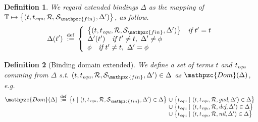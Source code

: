 \documentclass[12pt]{article}
\newtheorem{Definition}{Definition}[section]
\begin{document}
\begin{Definition}
  We regard extended bindings $\Delta$ as the mapping of
  $\mathbb{T} \mapsto \bigl\{(t, t_{\text{\it equ}}, \mathcal{R},
  \mathcal{S}_{\mathpzc{fin}}, \Delta') \bigr\}$, as follow.
  \begin{displaymath}
    \Delta(t') \;\stackrel{\mathrm{def}}{:=} \,\left\{\begin{array}{l}
      \bigl\{(t, t_{\text{\it equ}}, \mathcal{R},
       \mathcal{S}_{\mathpzc{fin}}, \Delta') \bigr\} \quad \text{\it if}\
        t' = t  \\
      \Delta'(t') \quad \text{\it if}\ t' \neq t,\ \Delta' \neq \phi  \\
       \phi \quad \text{\it if}\ t' \neq t,\ \Delta' = \phi
    \end{array}\right.
  \end{displaymath}
\end{Definition}


\begin{Definition}[Binding domain extended]
  We define a set of terms $t$ and $t_{\text{\it equ}}$ comming from
  $\Delta$ s.t. $(t, t_{\text{\it equ}}, \mathcal{R},
  \mathcal{S}_{\mathpzc{fin}}, \Delta') \in \Delta$ as
  $\mathpzc{Dom}(\Delta)$, e.g.
  \[ \mathpzc{Dom}(\Delta) \,\stackrel{\mathrm{def}}{:=}\,
  \bigl\{ t \ |\  (t, t_{\text{\it equ}}, \mathcal{R},
  \mathcal{S}_{\mathpzc{fin}}, \Delta') \in \Delta \bigr\}
  \!\begin{array}[t]{l}
    \cup\; \bigl\{t_{\text{\it equ}}  \ |\  (t, t_{\text{\it equ}},
     \mathcal{R},  \text{\it gnd}, \Delta') \in \Delta \bigr\}  \\
    \cup\; \bigl\{t_{\text{\it equ}}  \ |\  (t, t_{\text{\it equ}},
     \mathcal{R},  \text{\it def}, \Delta') \in \Delta \bigr\}  \\
    \cup\; \bigl\{t_{\text{\it equ}}  \ |\  (t, t_{\text{\it equ}},
     \mathcal{R}, \text{\it nil}, \Delta') \in \Delta \bigr\}
  \end{array}
  \]
\end{Definition}
\end{document}
